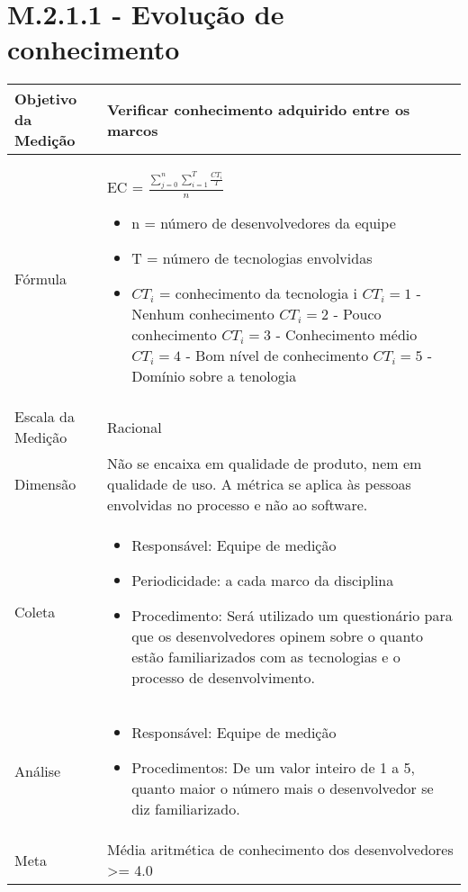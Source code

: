 	\section{M.2.1.1 - Evolução de conhecimento} %

	\begin{tabular}{ |p{4cm}|p{8cm}|  }
	 \hline
	 Objetivo da Medição 		& Verificar conhecimento adquirido entre os marcos	   \\
	 \hline
	 Fórmula		& 	EC = $ \frac{\sum_{j=0}^{n}\sum_{i=1}^{T}\frac{CT_i}{T}}{n} $	\begin{itemize}
		\item n = número de desenvolvedores da equipe
		\item T = número de tecnologias envolvidas
		\item $CT_i$ = conhecimento da tecnologia i
		\subitem $CT_i = 1$ - Nenhum conhecimento
		\subitem $CT_i = 2$ - Pouco conhecimento
		\subitem $CT_i = 3$ - Conhecimento médio
		\subitem $CT_i = 4$ - Bom nível de conhecimento
		\subitem $CT_i = 5$ - Domínio sobre a tenologia
	 \end{itemize}\\
	 \hline
	 Escala da Medição 		& 	Racional	 \\
	 \hline
	   Dimensão 		& 	Não se encaixa em qualidade de produto, nem em qualidade de uso. A métrica se aplica às pessoas envolvidas no processo e não ao software.	 \\
	 \hline
	 Coleta		& 	\begin{itemize} \item Responsável: Equipe de medição \item Periodicidade: a cada marco da disciplina \item Procedimento: Será utilizado um questionário para que os desenvolvedores opinem sobre o quanto estão familiarizados com as tecnologias e o processo de desenvolvimento. \end{itemize}		\\
	 \hline
	 Análise		& 	\begin{itemize} \item Responsável: Equipe de medição \item Procedimentos: De um valor inteiro de 1 a 5, quanto maior o número mais o desenvolvedor se diz familiarizado. \end{itemize}	 \\
	 \hline
	 Meta		& 	Média aritmética de conhecimento dos desenvolvedores >= 4.0	 \\
	 \hline
	\end{tabular}

